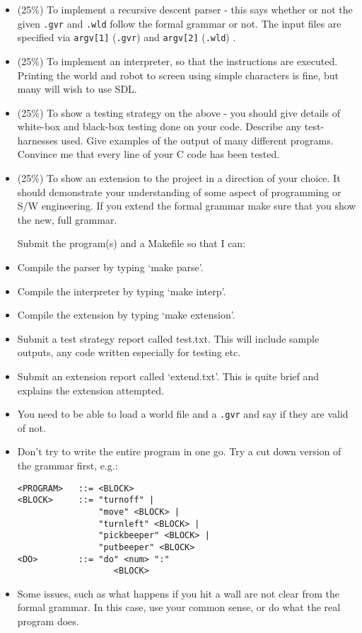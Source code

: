 \begin{exercise}
\begin{itemize}

\item (25\%) To implement a recursive descent parser - this says
whether or not the given \verb^.gvr^ and \verb^.wld^ follow the formal grammar or not.
The input files are specified via \verb^argv[1]^ (\verb^.gvr^) and \verb^argv[2]^ (\verb^.wld^) .

\item (25\%) To implement an interpreter, so that the instructions are
executed. Printing the world and robot to screen
using simple characters is fine, but many will wish to use SDL.

\item (25\%) To show a testing strategy on the above -
you should give details of
white-box and black-box testing done on your code. Describe any
test-harnesses used. Give examples of the output of many different
programs. Convince me that every line of your C code
has been tested.

\item (25\%) To show an extension to the project in a direction of
your choice. It should demonstrate your understanding of some aspect
of programming or S/W engineering. If you extend the formal grammar
make sure that you show the new, full grammar.

Submit the program(s) and a Makefile so that I can:

\item Compile the parser by typing `make parse'.
\item Compile the interpreter by typing `make interp'.
\item Compile the extension by typing `make extension'.
\item Submit a test strategy report called test.txt. This will include
sample outputs, any code written especially for testing etc.
\item Submit an extension report called `extend.txt'. This is quite
brief and explains the extension attempted.

\item You need to be able to load a world file and a \verb^.gvr^
and say if they are valid of not.
\item Don't try to write the entire program in one go. Try a cut
down version of the grammar first, e.g.:
{\small
\begin{verbatim}
<PROGRAM>   ::= <BLOCK>
<BLOCK>     ::= "turnoff" |
                "move" <BLOCK> |
                "turnleft" <BLOCK> |
                "pickbeeper" <BLOCK> |
                "putbeeper" <BLOCK>
<DO>        ::= "do" <num> ":"
                   <BLOCK>
\end{verbatim}
}
\item Some issues, such as what happens if you hit a wall
are not clear from the formal grammar. In this case, use your
common sense, or do what the real program does.
\end{itemize}
\end{exercise}


